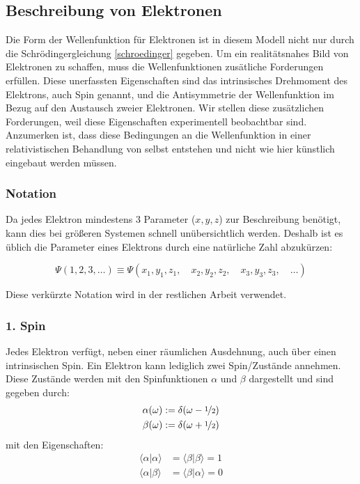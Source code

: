 \subsection{Beschreibung von Elektronen}\label{section_slater}
Die Form der Wellenfunktion für Elektronen ist in diesem Modell nicht nur 
durch die Schrödingergleichung \cref{schroedinger} gegeben.
Um ein realitätsnahes Bild von Elektronen zu schaffen,
muss die Wellenfunktionen zusätliche Forderungen erfüllen.
Diese unerfassten Eigenschaften sind das intrinsisches Drehmoment des Elektrons,
auch Spin genannt, und die Antisymmetrie der Wellenfunktion
im Bezug auf den Austausch zweier Elektronen.
Wir stellen diese zusätzlichen Forderungen,
weil diese Eigenschaften experimentell beobachtbar sind.
Anzumerken ist, dass diese Bedingungen an die Wellenfunktion 
in einer relativistischen Behandlung von selbst entstehen
und nicht wie hier künstlich eingebaut werden müssen.

\cite[S. 265, 270]{levine_2019}
\cite[4.5.3]{cramer_2004}

\subsubsection*{Notation}
Da jedes Elektron mindestens 3 Parameter ($x, y, z$) zur Beschreibung benötigt,
kann dies bei größeren Systemen schnell unübersichtlich werden.
Deshalb ist es üblich die Parameter eines Elektrons durch eine natürliche Zahl abzukürzen:

\begin{equation}
    \Psi(1, 2, 3, \dots) \equiv  \Psi(x_1, y_1, z_1, \quad
    x_2, y_2, z_2,\quad x_3, y_3, z_3, \quad\dots)
\end{equation}

Diese verkürzte Notation wird in der restlichen Arbeit verwendet.

\subsubsection*{1. Spin}\label{spin-section}
Jedes Elektron verfügt, neben einer räumlichen Ausdehnung, 
auch über einen intrinsischen Spin. 
Ein Elektron kann lediglich zwei Spin\-/Zustände annehmen.
Diese Zustände werden mit den Spinfunktionen $\alpha$ und
$\beta$ dargestellt und sind gegeben durch:
\begin{equation}\label{spin_function}
  \begin{aligned}
    \alpha(\omega) &:= \delta(\omega - \nicefrac{1}{2})\\
    \beta(\omega) &:= \delta(\omega + \nicefrac{1}{2})
  \end{aligned}
\end{equation}
mit den Eigenschaften:
\begin{equation}\label{spin_product}
  \begin{aligned}
    \langle \alpha \vert \alpha \rangle &= \langle \beta \vert \beta \rangle = 1 \\
    \langle \alpha \vert \beta \rangle &= \langle \beta \vert \alpha \rangle = 0
  \end{aligned}
\end{equation}

